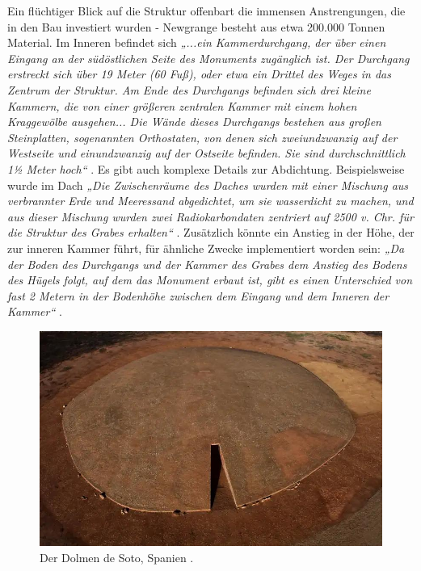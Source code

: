 \documentclass[10pt,twocolumn,letterpaper]{article}
\begin{document}
Ein flüchtiger Blick auf die Struktur offenbart die immensen Anstrengungen, die in den Bau investiert wurden - Newgrange besteht aus etwa 200.000 Tonnen Material. Im Inneren befindet sich \textit{„...ein Kammerdurchgang, der über einen Eingang an der südöstlichen Seite des Monuments zugänglich ist. Der Durchgang erstreckt sich über 19 Meter (60 Fuß), oder etwa ein Drittel des Weges in das Zentrum der Struktur. Am Ende des Durchgangs befinden sich drei kleine Kammern, die von einer größeren zentralen Kammer mit einem hohen Kraggewölbe ausgehen... Die Wände dieses Durchgangs bestehen aus großen Steinplatten, sogenannten Orthostaten, von denen sich zweiundzwanzig auf der Westseite und einundzwanzig auf der Ostseite befinden. Sie sind durchschnittlich 1½ Meter hoch“} \cite{70}. Es gibt auch komplexe Details zur Abdichtung. Beispielsweise wurde im Dach \textit{„Die Zwischenräume des Daches wurden mit einer Mischung aus verbrannter Erde und Meeressand abgedichtet, um sie wasserdicht zu machen, und aus dieser Mischung wurden zwei Radiokarbondaten zentriert auf 2500 v. Chr. für die Struktur des Grabes erhalten“} \cite{71}. Zusätzlich könnte ein Anstieg in der Höhe, der zur inneren Kammer führt, für ähnliche Zwecke implementiert worden sein: \textit{„Da der Boden des Durchgangs und der Kammer des Grabes dem Anstieg des Bodens des Hügels folgt, auf dem das Monument erbaut ist, gibt es einen Unterschied von fast 2 Metern in der Bodenhöhe zwischen dem Eingang und dem Inneren der Kammer“} \cite{71}.

\begin{figure}[b]
\begin{center}
   \includegraphics[width=1\linewidth]{dolmen.jpg}
\end{center}
   \caption{Der Dolmen de Soto, Spanien \cite{53}.}
\label{fig:9}
\label{fig:onecol}
\end{figure}
\end{document}
